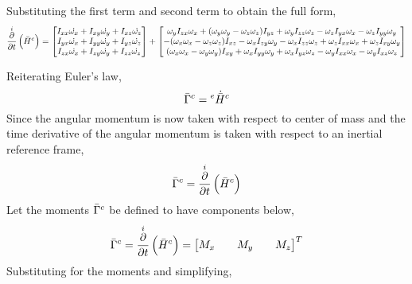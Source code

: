 \documentclass[class=report, 12pt, crop=false]{standalone}
\begin{document}
\begin{center}
Substituting the first term and second term to obtain the full form,
$$\overset{i}{\frac{\partial}{\partial t}}\left(\bar{H}^c\right) = 
\begin{bmatrix} 
I_{xx}\dot{\omega_x} + I_{xy}\dot{\omega_y} + I_{xz}\dot{\omega_z} \\
I_{yx}\dot{\omega_x} + I_{yy}\dot{\omega_y} + I_{yz}\dot{\omega_z} \\
I_{zx}\dot{\omega_x} + I_{zy}\dot{\omega_y} + I_{zz}\dot{\omega_z}
\end{bmatrix} + \begin{bmatrix}
\omega_yI_{zx}\omega_x + (\omega_y\omega_y - \omega_z\omega_z)I_{yz} + \omega_yI_{zz}\omega_z - \omega_zI_{yx}\omega_x - \omega_zI_{yy}\omega_y \\
-(\omega_x\omega_x - \omega_z\omega_z)I_{xz} - \omega_xI_{zy}\omega_y - \omega_xI_{zz}\omega_z + \omega_zI_{xx}\omega_x + \omega_zI_{xy}\omega_y \\
(\omega_x\omega_x - \omega_y\omega_y)I_{xy} + \omega_xI_{yy}\omega_y + \omega_xI_{yz}\omega_z - \omega_yI_{xx}\omega_x  - \omega_yI_{xz}\omega_z
\end{bmatrix}$$

Reiterating Euler's law,
$$\bar{\Gamma}^{c} = {}^{e}\dot{\bar{H}}^{c}$$
Since the angular momentum is now taken with respect to center of mass and the time derivative of the angular momentum is taken with respect to an inertial reference frame,
$$\bar{\Gamma}^{c} = \overset{i}{\frac{\partial}{\partial t}}\left(\bar{H}^c\right)$$
Let the moments $\bar{\Gamma}^{c}$ be defined to have components below,
$$\bar{\Gamma}^{c} = \overset{i}{\frac{\partial}{\partial t}}\left(\bar{H}^c\right) = \begin{bmatrix}M_x && M_y && M_z\end{bmatrix}^T$$
Substituting for the moments and simplifying,
\\~\\


\end{center}
\end{document}
